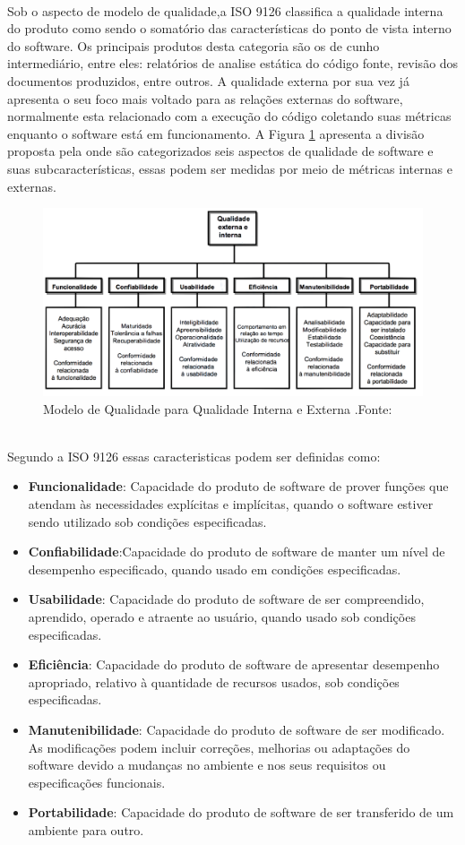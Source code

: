 \\ Sob o aspecto de modelo de qualidade,a ISO 9126 classifica a qualidade interna do produto como sendo o somatório das características do ponto de vista interno do software. Os principais produtos desta categoria são os de cunho intermediário, entre eles: relatórios de analise estática do código fonte, revisão dos documentos produzidos, entre outros. A qualidade externa por sua vez já apresenta o seu foco mais voltado para as relações externas do software, normalmente esta relacionado com a execução do código coletando suas métricas enquanto o software está em funcionamento. A Figura \ref{img:modelo_qualidade} apresenta a divisão proposta pela \cite{_nbr_2016} onde são categorizados seis aspectos de qualidade de software e suas subcaracterísticas, essas podem ser medidas por meio de métricas internas e externas. 
 \graphicspath{{figuras/}}
\begin{figure}
\centering
\includegraphics[scale=0.50]{Modelo_de_Qualidade}
\caption{Modelo de Qualidade para Qualidade Interna e Externa .Fonte:\cite{_nbr_2016}}
\label{img:modelo_qualidade}
\end{figure}
\\Segundo a ISO 9126 essas caracteristicas podem ser definidas como:
\begin{itemize}
\item \textbf{Funcionalidade}: Capacidade do produto de software de prover funções que atendam às necessidades explícitas e implícitas, quando o software estiver sendo utilizado sob condições especificadas.
\item \textbf{Confiabilidade}:Capacidade do produto de software de manter um nível de desempenho especificado, quando usado em condições especificadas.
\item \textbf{Usabilidade}: Capacidade do produto de software de ser compreendido, aprendido, operado e atraente ao usuário, quando usado sob condições especificadas.
\item \textbf{Eficiência}: Capacidade do produto de software de apresentar desempenho apropriado, relativo à quantidade de recursos usados, sob condições especificadas.
\item \textbf{Manutenibilidade}: Capacidade do produto de software de ser modificado. As modificações podem incluir correções, melhorias ou adaptações do software devido a mudanças no ambiente e nos seus requisitos ou especificações funcionais.
\item \textbf{Portabilidade}: Capacidade do produto de software de ser transferido de um ambiente para outro.
\end{itemize}
